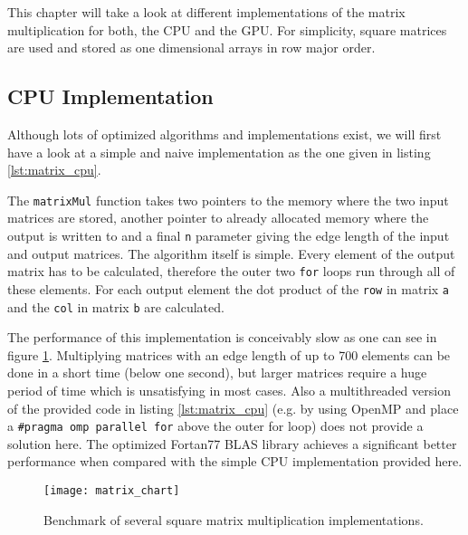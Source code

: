 This chapter will take a look at different implementations of the matrix multiplication for both, the CPU and the GPU. For simplicity, square matrices are used and stored as one dimensional arrays in row major order.

\subsection{CPU Implementation}
\label{sec:matrix_cpu_implementation}

Although lots of optimized algorithms and implementations exist, we will first have a look at a simple and naive implementation as the one given in listing \ref{lst:matrix_cpu}.



The \lstinline!matrixMul! function takes two pointers to the memory where the two input matrices are stored, another pointer to already allocated memory where the output is written to and a final \lstinline!n! parameter giving the edge length of the input and output matrices.
The algorithm itself is simple. Every element of the output matrix has to be calculated, therefore the outer two \lstinline!for! loops run through all of these elements. For each output element the dot product of the \lstinline!row! in matrix \lstinline!a! and the \lstinline!col! in matrix \lstinline!b! are calculated.

The performance of this implementation is conceivably slow as one can see in figure \ref{fig:matrix_chart}. Multiplying matrices with an edge length of up to 700 elements can be done in a short time (below one second), but larger matrices require a huge period of time which is unsatisfying in most cases.
Also a multithreaded version of the provided code in listing \ref{lst:matrix_cpu} (e.g. by using OpenMP and place a \lstinline!#pragma omp parallel for! above the outer for loop) does not provide a solution here.
The optimized Fortan77 BLAS library \cite{blas_lib} achieves a significant better performance when compared with the simple CPU implementation provided here.

\begin{figure}
	\centering
	\texttt{[image: matrix\_chart]}
	\caption{Benchmark of several square matrix multiplication implementations.
	}
	\label{fig:matrix_chart}
\end{figure}

